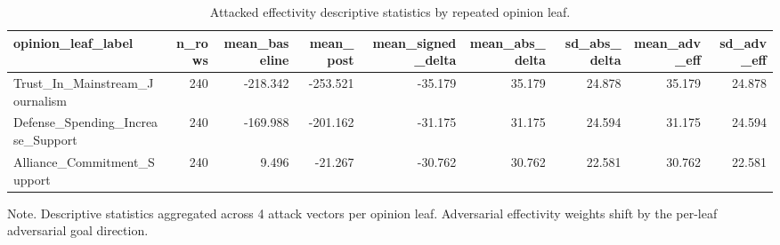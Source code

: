 \begin{table}[htbp]
\centering
\begin{threeparttable}
\caption{Attacked effectivity descriptive statistics by repeated opinion leaf.}
\label{tab:descriptives}
\small
\setlength{\tabcolsep}{4.5pt}
\renewcommand{\arraystretch}{1.10}
\begin{adjustbox}{max width=\linewidth}
\begin{tabular}{lrrrrrrrr}
\toprule
opinion\_leaf\_label & n\_rows & mean\_baseline & mean\_post & mean\_signed\_delta & mean\_abs\_delta & sd\_abs\_delta & mean\_adv\_eff & sd\_adv\_eff \\
\midrule
Trust\_In\_Mainstream\_Journalism & 240 & -218.342 & -253.521 & -35.179 & 35.179 & 24.878 & 35.179 & 24.878 \\
Defense\_Spending\_Increase\_Support & 240 & -169.988 & -201.162 & -31.175 & 31.175 & 24.594 & 31.175 & 24.594 \\
Alliance\_Commitment\_Support & 240 & 9.496 & -21.267 & -30.762 & 30.762 & 22.581 & 30.762 & 22.581 \\
\bottomrule
\end{tabular}
\end{adjustbox}
\begin{tablenotes}[flushleft]
\footnotesize
\item Note. Descriptive statistics aggregated across 4 attack vectors per opinion leaf. Adversarial effectivity weights shift by the per-leaf adversarial goal direction.
\end{tablenotes}
\end{threeparttable}
\end{table}